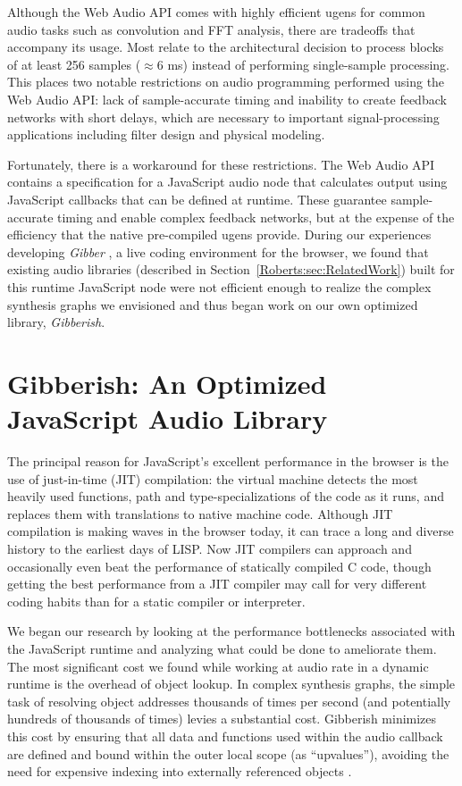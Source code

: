 Although the Web Audio API comes with highly efficient ugens for common audio tasks such as convolution and FFT analysis, there are tradeoffs that accompany its usage. Most relate to the architectural decision to process blocks of at least 256 samples ($\approx 6$ ms) instead of performing single-sample processing. This places two notable restrictions on audio programming performed using the Web Audio API: lack of sample-accurate timing and inability to create feedback networks with short delays, which are necessary to important signal-processing applications including filter design and physical modeling. 

Fortunately, there is a workaround for these restrictions. The Web Audio API contains a specification for a JavaScript audio node that calculates output using JavaScript callbacks that can be defined at runtime. These guarantee sample-accurate timing and enable complex feedback networks, but at the expense of the efficiency that the native pre-compiled ugens provide. During our experiences developing \emph{Gibber} \cite{Roberts:2011a}, a live coding environment for the browser, we found that existing audio libraries (described in Section~\ref{Roberts:sec:RelatedWork}) built for this runtime JavaScript node were not efficient enough to realize the complex synthesis graphs we envisioned and thus began work on our own optimized library, \emph{Gibberish}.

\section{Gibberish: An Optimized JavaScript Audio Library}

The principal reason for JavaScript's excellent performance in the browser is the use of just-in-time (JIT) compilation: the virtual machine detects the most heavily used functions, path and type-specializations of the code as it runs, and replaces them with translations to native machine code. Although JIT compilation is making waves in the browser today, it can trace a long and diverse history to the earliest days of LISP\cite [p.7006]{Aycock:2003}. Now JIT compilers can approach and occasionally even beat the performance of statically compiled C code, though getting the best performance from a JIT compiler may call for very different coding habits than for a static compiler or interpreter. 

We began our research by looking at the performance bottlenecks associated with the JavaScript runtime and analyzing what could be done to ameliorate them. The most significant cost we found while working at audio rate in a dynamic runtime is the overhead of object lookup. In complex synthesis graphs, the simple task of resolving object addresses thousands of times per second (and potentially hundreds of thousands of times) levies a substantial cost. Gibberish minimizes this cost by ensuring that all data and functions used within the audio callback are defined and bound within the outer local scope (as ``upvalues''), avoiding the need for expensive indexing into externally referenced objects \cite{Herczeg:2009}.

